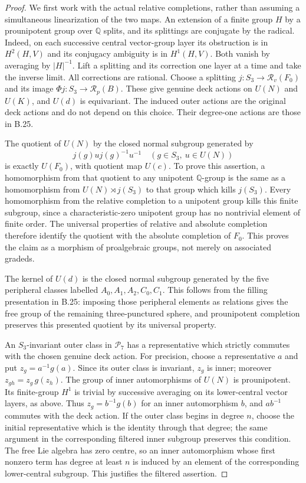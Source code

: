 \begin{proof}
We first work with the actual relative completions, rather than
assuming a simultaneous linearization of the two maps. An extension
of a finite group $H$ by a prounipotent group over $\mathbb Q$
splits, and its splittings are conjugate by the radical. Indeed,
on each successive central vector-group layer its obstruction
is in $H^2(H,V)$ and its conjugacy ambiguity is in $H^1(H,V)$.
Both vanish by averaging by $|H|^{-1}$. Lift a splitting and its
correction one layer at a time and take the inverse limit. All
corrections are rational. Choose a splitting
$j:S_3\to\mathscr R_v(F_0)$ and its image
$\Phi j:S_3\to\mathscr R_p(B)$. These give genuine deck
actions on $U(N)$ and $U(K)$, and $U(d)$ is equivariant.
The induced outer actions are the original deck actions and do
not depend on this choice. Their degree-one actions are those
in B.25.

The quotient of $U(N)$ by the closed normal subgroup generated
by
\[
                 j(g)u j(g)^{-1}u^{-1}
       \quad(g\in S_3,\ u\in U(N))
\]
is exactly $U(F_0)$, with quotient map $U(c)$. To prove this
assertion, a homomorphism from that quotient to any unipotent
$\mathbb Q$-group is the same as a homomorphism from
$U(N)\rtimes j(S_3)$ to that group which kills $j(S_3)$.
Every homomorphism from the relative completion to a unipotent
group kills this finite subgroup, since a characteristic-zero
unipotent group has no nontrivial element of finite order.
The universal properties of relative and absolute completion
therefore identify the quotient with the absolute completion
of $F_0$. This proves the claim as a morphism of proalgebraic
groups, not merely on associated gradeds.

The kernel of $U(d)$ is the closed normal subgroup generated
by the five peripheral classes labelled $A_0,A_1,A_2,C_0,C_1$.
This follows from the filling presentation in B.25: imposing
those peripheral elements as relations gives the free group
of the remaining three-punctured sphere, and prounipotent
completion preserves this presented quotient by its universal
property.

An $S_3$-invariant outer class in $\mathcal P_7$ has a
representative which strictly commutes with the chosen genuine
deck action. For precision, choose a representative $a$ and
put $z_g=a^{-1}g(a)$. Since its outer class is invariant,
$z_g$ is inner; moreover
$z_{gh}=z_g\,g(z_h)$. The group of inner automorphisms of
$U(N)$ is prounipotent. Its finite-group $H^1$ is trivial by
successive averaging on its lower-central vector layers,
as above. Thus $z_g=b^{-1}g(b)$ for an inner automorphism
$b$, and $ab^{-1}$ commutes with the deck action. If the
outer class begins in degree $n$, choose the initial
representative which is the identity through that degree;
the same argument in the corresponding filtered inner
subgroup preserves this condition. The free Lie algebra has
zero centre, so an inner automorphism whose first nonzero
term has degree at least $n$ is induced by an element of
the corresponding lower-central subgroup. This justifies
the filtered assertion.


\end{proof}
